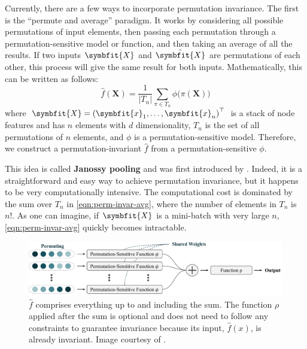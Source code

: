Currently, there are a few ways to incorporate permutation invariance. The first is the ``permute and average'' paradigm. It works by considering all possible permutations of input elements, then passing each permutation through a permutation-sensitive model or function, and then taking an average of all the results. If two inputs $\symbfit{X}$ and $\Tilde{\symbfit{X}}$ are permutations of each other, this process will give the same result for both inputs. Mathematically, this can be written as follows:
\begin{equation}
    \label{eqn:perm-invar-avg}
    \widehat{f}(\symbf{X}) = \frac{1}{|{T}_n|} \sum_{\pi \in {T}_n} \phi \bigl( \pi \left( \symbf{X} \right) \bigr)
\end{equation}
where $\symbfit{X}=\left(\symbfit{x}_1, \ldots, \symbfit{x}_n\right)^\top$ is a stack of node features and has $n$ elements with $d$ dimensionality, $T_n$ is the set of all permutations of $n$ elements, and $\phi$ is a permutation-sensitive model. Therefore, we construct a permutation-invariant $\widehat{f}$ from a permutation-sensitive $\phi$.

This idea is called \textbf{Janossy pooling} and was first introduced by \textcite{Murphy2018}. Indeed, it is a straightforward and easy way to achieve permutation invariance, but it happens to be very computationally intensive. The computational cost is dominated by the sum over $T_n$ in \cref{eqn:perm-invar-avg}, where the number of elements in $T_n$ is $n!$. As one can imagine, if $\symbfit{X}$ is a mini-batch with very large $n$, \cref{eqn:perm-invar-avg} quickly becomes intractable.

\begin{figure}[bh]
    \centering
    \includegraphics[width=\textwidth]{chapters/assets/graph-figs/permuting.pdf}
    \caption{$\widehat{f}$ comprises everything up to and including the sum. The function $\rho$ applied after the sum is optional and does not need to follow any constraints to guarantee invariance because its input, $\widehat{f}(x)$, is already invariant. Image courtesy of \textcite{wagstaff2022universal}.}
    \label{fig:basic-perm-invar}
\end{figure}

